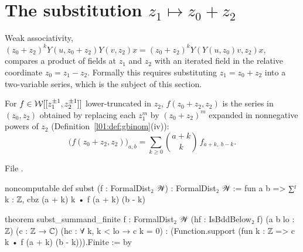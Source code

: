\section{The substitution \texorpdfstring{$z_1\mapsto z_0+z_2$}{z1 to z0+z2}}\label{l01:sec:substitution}

Weak associativity, $(z_0+z_2)^kY(u,z_0+z_2)Y(v,z_2)x = (z_0+z_2)^kY(Y(u,z_0)v,z_2)x$, compares a product of fields at
$z_1$ and $z_2$ with an iterated field in the relative coordinate $z_0 = z_1-z_2$. Formally this requires substituting
$z_1 = z_0+z_2$ into a two-variable series, which is the subject of this section.

\begin{definition}[Substitution]\label{l01:def:subst}
For $f\in\mathcal{W}[[z_1^{\pm1},z_2^{\pm1}]]$ lower-truncated in $z_2$, $f(z_0+z_2,z_2)$ is the series in $(z_0,z_2)$ obtained by
replacing each $z_1^m$ by $(z_0+z_2)^m$ expanded in nonnegative powers of $z_2$ (Definition~\ref{l01:def:gbinom}(iv)):
\begin{equation*}
  \big(f(z_0+z_2,z_2)\big)_{a,b} = \sum_{k\ge0}\binom{a+k}{k}\,f_{a+k,\;b-k}.
\end{equation*}
\end{definition}

\noindent File .
\begin{leancode}
noncomputable def subst (f : FormalDist₂ 𝒲) : FormalDist₂ 𝒲 :=
  fun a b => ∑ᶠ k : ℤ, cbz (a + k) k • f (a + k) (b - k)

theorem subst_summand_finite {f : FormalDist₂ 𝒲} (hf : IsBddBelow₂ f) (a b lo : ℤ) (c : ℤ → ℂ)
    (hc : ∀ k, k < lo → c k = 0) :
    (Function.support (fun k : ℤ => c k • f (a + k) (b - k))).Finite := by
\end{leancode}

